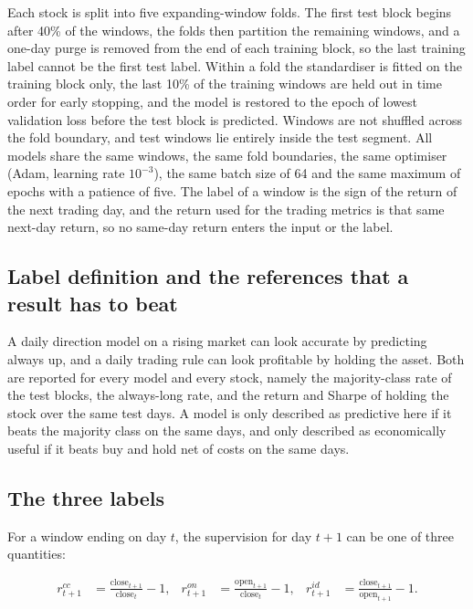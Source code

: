 \documentclass[pdflatex,sn-mathphys-ay]{sn-jnl}
\theoremstyle{thmstyleone}%
\theoremstyle{thmstyletwo}%
\theoremstyle{thmstyletwo}%
\begin{document}
Each stock is split into five expanding-window folds. The first test block begins after 40\% of the
windows, the folds then partition the remaining windows, and a one-day purge is removed from the end
of each training block, so the last training label cannot be the first test label. Within a fold the
standardiser is fitted on the training block only, the last 10\% of the training windows are held out
in time order for early stopping, and the model is restored to the epoch of lowest validation loss
before the test block is predicted. Windows are not shuffled across the fold boundary, and test
windows lie entirely inside the test segment. All models share the same windows, the same fold
boundaries, the same optimiser (Adam, learning rate $10^{-3}$), the same batch size of 64 and the
same maximum of \nEpochs{} epochs with a patience of five. The label of a window is the sign of the
return of the next trading day, and the return used for the trading metrics is that same next-day
return, so no same-day return enters the input or the label.

\subsection{Label definition and the references that a result has to beat}

A daily direction model on a rising market can look accurate by predicting always up, and a daily
trading rule can look profitable by holding the asset. Both are reported for every model and every
stock, namely the majority-class rate of the test blocks, the always-long rate, and the return and
Sharpe of holding the stock over the same test days. A model is only described as predictive here if it
beats the majority class on the same days, and only described as economically useful if it beats buy
and hold net of costs on the same days.

\subsection{The three labels}

For a window ending on day $t$, the supervision for day $t+1$ can be one of three quantities:

\begin{align}
	r^{cc}_{t+1} &= \frac{\text{close}_{t+1}}{\text{close}_t} - 1, &
	r^{on}_{t+1} &= \frac{\text{open}_{t+1}}{\text{close}_t} - 1, &
	r^{id}_{t+1} &= \frac{\text{close}_{t+1}}{\text{open}_{t+1}} - 1 .
\end{align}
\end{document}
